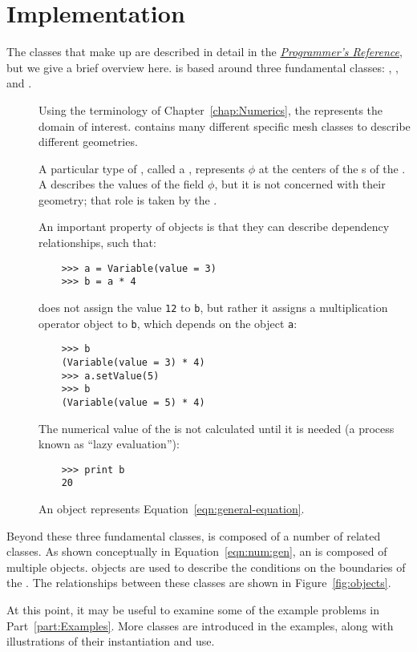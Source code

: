 \section{Implementation}

The \Python{} classes that make up \FiPy{} are described in detail in
the \href{file:reference.pdf}{\textit{\FiPy{} Programmer's Reference}},
but we give a brief overview here.  \FiPy{} is based around three
fundamental \Python{} classes: , , and
.  
\begin{description}
    \item[] Using the terminology of
    Chapter~\ref{chap:Numerics}, the  represents the
    domain of interest.  \FiPy{} contains many different specific mesh
    classes to describe different geometries.

    \item[] A particular type of ,
    called a , represents \( \phi \) at the
    centers of the s of the .  A
     describes the values of the field \( \phi \),
    but it is not concerned with their geometry; that role is taken by
    the .

    An important property of  objects is that they can
    describe dependency relationships, such that:
    \begin{verbatim}
	>>> a = Variable(value = 3)
	>>> b = a * 4
    \end{verbatim}
    does not assign the value \verb|12| to \verb|b|, but rather it assigns
    a multiplication operator object to \verb|b|, which depends on the
     object \verb|a|:
    \begin{verbatim}
	>>> b
	(Variable(value = 3) * 4)
	>>> a.setValue(5)
	>>> b
	(Variable(value = 5) * 4)
    \end{verbatim}
    The numerical value of the  is not calculated until it
    is needed (a process known as ``lazy evaluation''):
    \begin{verbatim}
	>>> print b
	20
    \end{verbatim}

    \item[] An  object represents
    Equation~\eqref{eqn:general-equation}. 
\end{description}

Beyond these three fundamental classes, \FiPy{} is composed of a
number of related classes.  As shown conceptually in
Equation~\eqref{eqn:num:gen}, an  is composed of
multiple  objects.   objects are
used to describe the conditions on the boundaries of the .
The relationships between these classes are shown in
Figure~\ref{fig:objects}.

At this point, it may be useful to examine some of the example
problems in Part~\ref{part:Examples}.  More classes are introduced in
the examples, along with illustrations of their instantiation and use.


